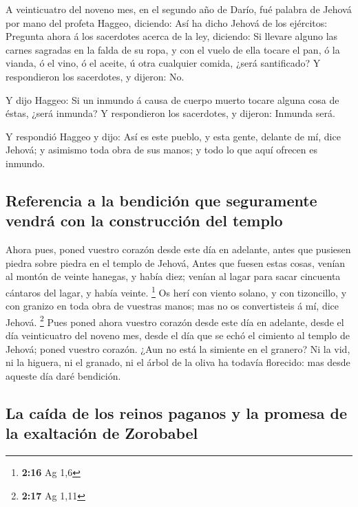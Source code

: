  A veinticuatro del noveno mes, en el segundo año de Darío,
fué palabra de Jehová por mano del profeta Haggeo, diciendo:
 Así ha dicho Jehová de los ejércitos: Pregunta ahora á los
sacerdotes acerca de la ley, diciendo:  Si llevare alguno
las carnes sagradas en la falda de su ropa, y con el vuelo de ella
tocare el pan, ó la vianda, ó el vino, ó el aceite, ú otra cualquier
comida, ¿será santificado? Y respondieron los sacerdotes, y dijeron:
No.~

 Y dijo Haggeo: Si un inmundo á causa de cuerpo muerto
tocare alguna cosa de éstas, ¿será inmunda? Y respondieron los
sacerdotes, y dijeron: Inmunda será.

 Y respondió Haggeo y dijo: Así es este pueblo, y esta
gente, delante de mí, dice Jehová; y asimismo toda obra de sus manos; y
todo lo que aquí ofrecen es inmundo.

\hypertarget{referencia-a-la-bendiciuxf3n-que-seguramente-vendruxe1-con-la-construcciuxf3n-del-templo}{%
\subsection{Referencia a la bendición que seguramente vendrá con la
construcción del
templo}\label{referencia-a-la-bendiciuxf3n-que-seguramente-vendruxe1-con-la-construcciuxf3n-del-templo}}

 Ahora pues, poned vuestro corazón desde este día en
adelante, antes que pusiesen piedra sobre piedra en el templo de Jehová,
 Antes que fuesen estas cosas, venían al montón de veinte
hanegas, y había diez; venían al lagar para sacar cincuenta cántaros del
lagar, y había veinte. \footnote{\textbf{2:16} Ag 1,6}  Os
herí con viento solano, y con tizoncillo, y con granizo en toda obra de
vuestras manos; mas no os convertisteis á mí, dice Jehová. \footnote{\textbf{2:17}
  Ag 1,11}  Pues poned ahora vuestro corazón desde este día
en adelante, desde el día veinticuatro del noveno mes, desde el día que
se echó el cimiento al templo de Jehová; poned vuestro corazón.
 ¿Aun no está la simiente en el granero? Ni la vid, ni la
higuera, ni el granado, ni el árbol de la oliva ha todavía florecido:
mas desde aqueste día daré bendición.

\hypertarget{la-cauxedda-de-los-reinos-paganos-y-la-promesa-de-la-exaltaciuxf3n-de-zorobabel}{%
\subsection{La caída de los reinos paganos y la promesa de la exaltación
de
Zorobabel}\label{la-cauxedda-de-los-reinos-paganos-y-la-promesa-de-la-exaltaciuxf3n-de-zorobabel}}


